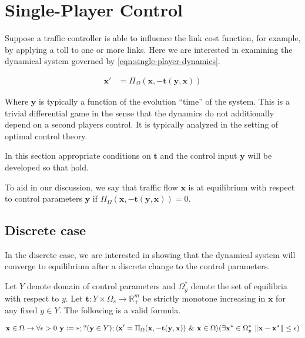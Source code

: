 \section{Single-Player Control}\label{sec:single-player-control}

Suppose a traffic controller is able to influence the link cost function, for example, by applying a toll to one or more links.
Here we are interested in examining the dynamical system governed by \eqref{eqn:single-player-dynamics}. 

\begin{align}
    \mathbf{x}' &= \Pi_{\Omega} (\mathbf{x}, -\mathbf{t}(\mathbf{y}, \mathbf{x}))\label{eqn:single-player-dynamics}
\end{align}

Where $\mathbf{y}$ is typically a function of the evolution ``time'' of the system.
This is a trivial differential game in the sense that the dynamics do not additionally depend on a second players control.
It is typically analyzed in the setting of optimal control theory. \citep{bardi2008optimal}

In this section appropriate conditions on $\mathbf{t}$ and the control input $\mathbf{y}$ will be developed so that  hold.

To aid in our discussion, we say that traffic flow $\mathbf{x}$ is at equilibrium with respect to control parameters $\mathbf{y}$ if $\Pi_{\Omega} (\mathbf{x}, -\mathbf{t}(\mathbf{y}, \mathbf{x}))=0$.

\subsection{Discrete case}

In the discrete case, we are interested in showing that the dynamical system will converge to equilibrium after a discrete change to the control parameters.

\begin{theorem}
Let $Y$ denote domain of control parameters and $\Omega^*_y$ denote the set of equilibria with respect to $y$. Let $\mathbf{t}: Y\times \Omega_s \to \mathbb{R}^m_+$ be strictly monotone increasing in $\mathbf{x}$ for any fixed $y\in Y$. The following is a valid formula.

$$\mathbf{x} \in \Omega \to \forall \epsilon > 0\  \mathbf{y}\vcentcolon= *;?(\mathbf{y}\in Y); \langle \mathbf{x}'=\Pi_{\Omega}(\mathbf{x}, -\mathbf{t}(\mathbf{y}, \mathbf{x}))\ \&\ \mathbf{x}\in \Omega\rangle (\exists \mathbf{x}^*\in \Omega^*_\mathbf{y}\ \|\mathbf{x} - \mathbf{x}^*\| \leq \epsilon)$$
\end{theorem}

